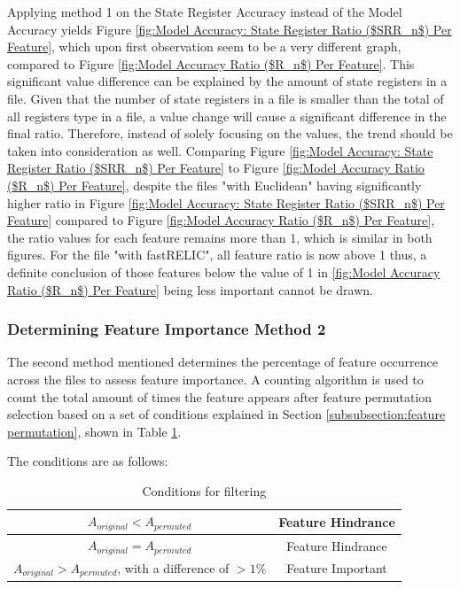 \documentclass{tum-book}
\begin{document}
        \bigskip\noindent 
        Applying method 1 on the State Register Accuracy instead of the Model Accuracy yields Figure \ref{fig:Model Accuracy: State Register Ratio ($SRR_n$) Per Feature}, which upon first observation seem to be a very different graph, compared to Figure \ref{fig:Model Accuracy Ratio ($R_n$) Per Feature}. This significant value difference can be explained by the amount of state registers in a file. Given that the number of state registers in a file is smaller than the total of all registers type in a file, a value change will cause a significant difference in the final ratio. Therefore, instead of solely focusing on the values, the trend should be taken into consideration as well. Comparing Figure \ref{fig:Model Accuracy: State Register Ratio ($SRR_n$) Per Feature} to Figure \ref{fig:Model Accuracy Ratio ($R_n$) Per Feature}, despite the files "with Euclidean" having significantly higher ratio in Figure \ref{fig:Model Accuracy: State Register Ratio ($SRR_n$) Per Feature} compared to Figure \ref{fig:Model Accuracy Ratio ($R_n$) Per Feature}, the ratio values for each feature remains more than 1, which is similar in both figures. For the file "with fastRELIC", all feature ratio is now above 1 thus, a definite conclusion of those features below the value of 1 in \ref{fig:Model Accuracy Ratio ($R_n$) Per Feature} being less important cannot be drawn.
        
        
        \subsubsection{Determining Feature Importance Method 2}\label{subsection:determining feature importance 2}
        The second method mentioned determines the percentage of feature occurrence across the files to assess feature importance. A counting algorithm is used to count the total amount of times the feature appears after feature permutation selection based on a set of conditions explained in Section \ref{subsubsection:feature permutation}, shown in Table \ref{tab: conditions for filtering}. 
        
        \newpage\noindent
        The conditions are as follows:
            \begin{table}[ht]
                \centering
                \begin{tabular}{|c|c|}
                \hline
                $A_{original}<A_{permuted}$ & Feature Hindrance\\
                \hline
                $A_{original}=A_{permuted}$ & Feature Hindrance\\
                \hline
                $A_{original}>A_{permuted}$, \; with a difference of $> 1\%$  & Feature Important\\
                \hline
                \end{tabular}
                \caption{Conditions for filtering}
                \label{tab: conditions for filtering}
            \end{table}
    
\end{document}
